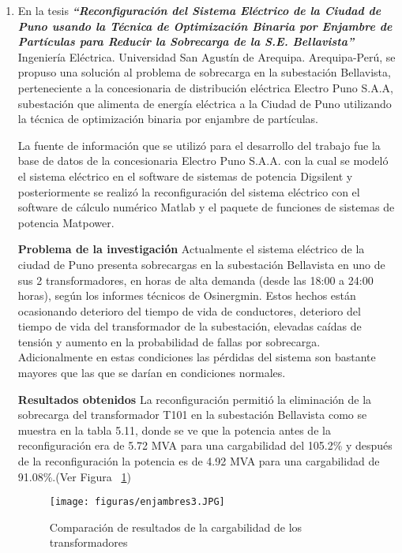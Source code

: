 \documentclass[10pt,conference]{IEEEtran}
\begin{document}
\begin{enumerate}
    \item En la tesis \textbf{\textit{“Reconfiguración del Sistema Eléctrico de la Ciudad de Puno usando la Técnica de Optimización Binaria por Enjambre de Partículas para Reducir la Sobrecarga de la S.E. Bellavista”}} Ingeniería Eléctrica. Universidad San Agustín de Arequipa. Arequipa-Perú, \citep{cornejo} se propuso una solución al problema de sobrecarga en la subestación Bellavista, perteneciente a la concesionaria de distribución eléctrica Electro Puno S.A.A, subestación que alimenta de energía eléctrica a la Ciudad de Puno utilizando la técnica de optimización binaria por enjambre de partículas. \par
    La fuente de información que se utilizó para el desarrollo del trabajo fue la base de datos de la concesionaria Electro Puno S.A.A. con la cual se modeló el sistema eléctrico en el software de sistemas de potencia Digsilent y posteriormente se realizó la reconfiguración del sistema eléctrico con el software de cálculo numérico Matlab y el paquete de funciones de sistemas de potencia Matpower.

    \textbf{Problema de la investigación} Actualmente el sistema eléctrico de la ciudad de Puno presenta sobrecargas en la subestación Bellavista en uno de sus 2 transformadores, en horas de alta demanda (desde las 18:00 a 24:00 horas), según los informes técnicos de Osinergmin. Estos hechos están ocasionando deterioro del tiempo de vida de conductores, deterioro del tiempo de vida del transformador de la subestación, elevadas caídas de tensión y aumento en la probabilidad de fallas por sobrecarga. Adicionalmente en estas condiciones las pérdidas del sistema son bastante mayores que las que se darían en condiciones normales.\par
    \textbf{Resultados obtenidos}
    La reconfiguración permitió la eliminación de la sobrecarga del transformador T101 en la subestación Bellavista como se muestra en la tabla 5.11, donde se ve que la potencia antes de la reconfiguración era de 5.72 MVA para una cargabilidad del 105.2\% y después de la reconfiguración la potencia es de 4.92 MVA para una cargabilidad de 91.08\%.(Ver Figura ~\ref{f3enjambre})

    \begin{figure}[H]
    \begin{center}
       \texttt{[image: figuras/enjambres3.JPG]}
      \caption{Comparación de resultados de la cargabilidad de los transformadores}
      \label{f3enjambre} 
      \end{center}
    \end{figure}    
    
\end{enumerate}
\end{document}
